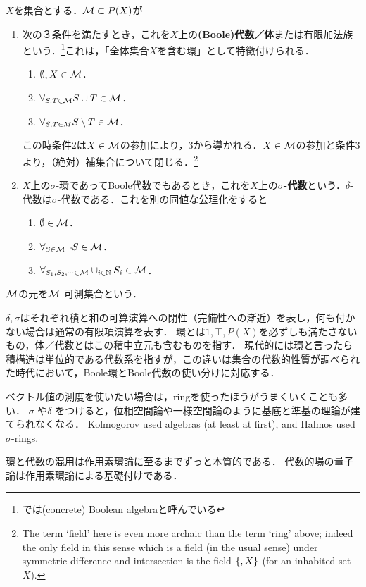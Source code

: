 \documentclass[uplatex, dvipdfmx]{jsreport}
\begin{document}
\begin{definition}\label{def-sigma-algebra}
    $X$を集合とする．$\mathcal{M}\subset P(X)$が
    \begin{enumerate}
        \item 次の３条件を満たすとき，これを$X$上の\textbf{(Boole)代数／体}または有限加法族という．\footnote{\cite{Tao}では(concrete) Boolean algebraと呼んでいる}これは，「全体集合$X$を含む環」として特徴付けられる．
        \begin{enumerate}[1]
            \item $\emptyset,X\in\mathcal{M}$．
            \item $\forall_{S,T\in\mathcal{M}}S\cup T\in\mathcal{M}$．
            \item $\forall_{S,T\in M}S\setminus T\in\mathcal{M}$．
        \end{enumerate}
        この時条件2は$X\in\mathcal{M}$の参加により，3から導かれる．$X\in\mathcal{M}$の参加と条件3より，（絶対）補集合について閉じる．\footnote{The term ‘field’ here is even more archaic than the term ‘ring’ above; indeed the only field in this sense which is a field (in the usual sense) under symmetric difference and intersection is the field $\{\empty, X\}$ (for an inhabited set $X$).}
        \item $X$上の$\sigma$-環であってBoole代数でもあるとき，これを$X$上の\textbf{$\sigma$-代数}という．$\delta$-代数は$\sigma$-代数である．これを別の同値な公理化をすると
        \begin{enumerate}[1]
            \item $\emptyset\in\mathcal{M}$．
            \item $\forall_{S\in\mathcal{M}}\lnot S\in\mathcal{M}$．
            \item $\forall_{S_1,S_2,\cdots\in\mathcal{M}}\cup_{i\in\mathbb{N}}S_i\in\mathcal{M}$．
        \end{enumerate}
    \end{enumerate}
    $\mathcal{M}$の元を$\mathcal{M}$-可測集合という．
\end{definition}
\begin{remark}
    $\delta,\sigma$はそれぞれ積と和の可算演算への閉性（完備性への漸近）を表し，何も付かない場合は通常の有限項演算を表す．
    環とは$1,\top,P(X)$を必ずしも満たさないもの，体／代数とはこの積中立元も含むものを指す．
    現代的には環と言ったら積構造は単位的である代数系を指すが，この違いは集合の代数的性質が調べられた時代において，Boole環とBoole代数の使い分けに対応する．

    ベクトル値の測度を使いたい場合は，ringを使ったほうがうまくいくことも多い．
    $\sigma$-や$\delta$-をつけると，位相空間論や一様空間論のように基底と準基の理論が建てられなくなる．
    Kolmogorov used algebras (at least at first), and Halmos used $\sigma$-rings.

    環と代数の混用は作用素環論に至るまでずっと本質的である．
    代数的場の量子論は作用素環論による基礎付けである．
\end{remark}
\end{document}
